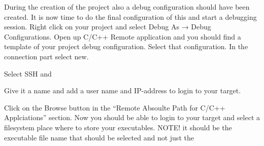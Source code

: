 \begin{DoxyItemize}
\item During the creation of the project also a debug configuration should have been created. It is now time to do the final configuration of this and start a debugging session. Right click on your project and select Debug As → Debug Configurations. Open up C/\+C++ Remote application and you should find a template of your project debug configuration. Select that configuration. In the connection part select new.
\begin{DoxyEnumerate}
\item Select S\+SH and
\item Give it a name and add a user name and I\+P-\/address to login to your target.
\end{DoxyEnumerate}
\item Click on the Browse button in the “\+Remote Absoulte Path for C/\+C++ Applciations” section. Now you should be able to login to your target and select a filesystem place where to store your executables. N\+O\+T\+E! it should be the executable file name that should be selected and not just the ~\newline
 
\end{DoxyItemize}